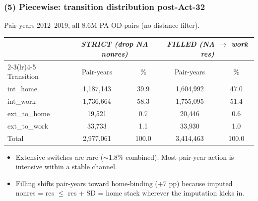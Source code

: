 \documentclass[xcolor = x11names, compress, aspectratio = 169]{beamer}
\renewcommand{\(}{\begin{columns}}
\renewcommand{\)}{\end{columns}}
\newcommand{\<}[1]{\begin{column}{#1}}
\renewcommand{\>}{\end{column}}
\begin{document}
\begin{frame}
\frametitle{(5) Piecewise: transition distribution post-Act-32}
    \centering
    \scriptsize
    Pair-years 2012--2019, all 8.6M PA OD-pairs (no distance filter).
    \renewcommand{\arraystretch}{1.05}
    \setlength{\tabcolsep}{6pt}
    \begin{tabular}{lcccc}
        \toprule
        & \multicolumn{2}{c}{\textit{STRICT (drop NA nonres)}}
        & \multicolumn{2}{c}{\textit{FILLED (NA $\to$ work res)}} \\
        \cmidrule(lr){2-3}\cmidrule(lr){4-5}
        Transition & Pair-years & \% & Pair-years & \% \\
        \midrule
        int\_home    & 1{,}187{,}143 & 39.9 & 1{,}604{,}992 & 47.0 \\
        int\_work    & 1{,}736{,}664 & 58.3 & 1{,}755{,}095 & 51.4 \\
        ext\_to\_home &     19{,}521 &  0.7 &     20{,}446 &  0.6 \\
        ext\_to\_work &     33{,}733 &  1.1 &     33{,}930 &  1.0 \\
        \midrule
        Total        & 2{,}977{,}061 & 100.0 & 3{,}414{,}463 & 100.0 \\
        \bottomrule
    \end{tabular}
    \vspace{0.1cm}
    \begin{itemize}\setlength{\itemsep}{0.04cm}\small
        \item Extensive switches are rare ($\sim$1.8\% combined). Most
        pair-year action is intensive within a stable channel.
        \item Filling shifts pair-years toward home-binding ($+7$ pp)
        because imputed nonres = res $\le$ res + SD = home stack
        wherever the imputation kicks in.
    \end{itemize}
\end{frame}
\end{document}
